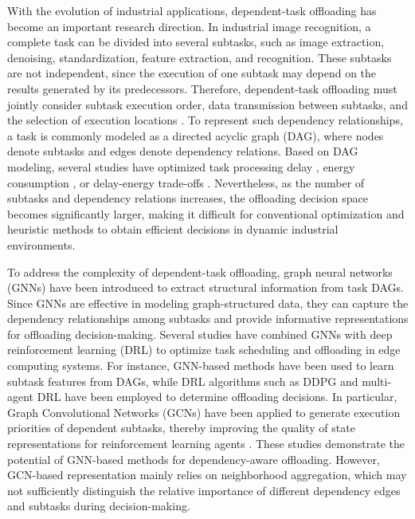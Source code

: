 \documentclass[conference]{IEEEtran}
\begin{document}
With the evolution of industrial applications, dependent-task offloading has become an important research direction. In industrial image recognition, a complete task can be divided into several subtasks, such as image extraction, denoising, standardization, feature extraction, and recognition. These subtasks are not independent, since the execution of one subtask may depend on the results generated by its predecessors. Therefore, dependent-task offloading must jointly consider subtask execution order, data transmission between subtasks, and the selection of execution locations \cite{10496897}. To represent such dependency relationships, a task is commonly modeled as a directed acyclic graph (DAG), where nodes denote subtasks and edges denote dependency relations. Based on DAG modeling, several studies have optimized task processing delay \cite{nguyen2023dependency}, energy consumption \cite{mehrabi2020energy}, or delay-energy trade-offs \cite{xu2023energy}. Nevertheless, as the number of subtasks and dependency relations increases, the offloading decision space becomes significantly larger, making it difficult for conventional optimization and heuristic methods to obtain efficient decisions in dynamic industrial environments.

To address the complexity of dependent-task offloading, graph neural networks (GNNs) have been introduced to extract structural information from task DAGs. Since GNNs are effective in modeling graph-structured data, they can capture the dependency relationships among subtasks and provide informative representations for offloading decision-making. Several studies have combined GNNs with deep reinforcement learning (DRL) to optimize task scheduling and offloading in edge computing systems. For instance, GNN-based methods have been used to learn subtask features from DAGs, while DRL algorithms such as DDPG and multi-agent DRL have been employed to determine offloading decisions. In particular, Graph Convolutional Networks (GCNs) have been applied to generate execution priorities of dependent subtasks, thereby improving the quality of state representations for reinforcement learning agents \cite{10892268}. These studies demonstrate the potential of GNN-based methods for dependency-aware offloading. However, GCN-based representation mainly relies on neighborhood aggregation, which may not sufficiently distinguish the relative importance of different dependency edges and subtasks during decision-making.
\end{document}
